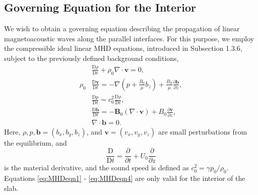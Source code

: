 \documentclass[12pt]{ociamthesis}
\begin{document}
\subsection{Governing Equation for the Interior}
\label{subsec:goveqint}

We wish to obtain a governing equation describing the propagation of linear magnetoacoustic waves along the parallel interfaces.
For this purpose, we employ the compressible ideal linear MHD equations, introduced in Subsection 1.3.6, subject to the previously defined background conditions,
%
\begin{align}
\label{eq:MHDeqn1}
& \frac{\mathrm{D} \rho}{\mathrm{D} t}
+ \rho_0 \nabla \cdot \mathbf{v}
= 0,
\\[0.3cm]
\label{eq:MHDeqn2}
\rho_0 & \frac{\mathrm{D} \mathbf{v}}{\mathrm{D} t}
= - \nabla ( p + \frac{B_0}{\mu} b_z )
+ \frac{B_0}{\mu} \frac{\partial \mathbf{b}}{\partial z},
\\[0.3cm]
\label{eq:MHDeqn3}
& \frac{\mathrm{D} p}{\mathrm{D} t}
= c_0^2 \frac{\mathrm{D} \rho}{\mathrm{D} t},
\\[0.3cm]
\label{eq:MHDeqn4}
& \frac{\mathrm{D} \mathbf{b}}{\mathrm{D} t}
= - \mathbf{B}_0 ( \nabla \cdot \mathbf{v} )
+ B_0 \frac{\partial \mathbf{v}}{\partial z},
\\[0.2cm]
\nonumber
& \nabla \cdot \mathbf{b} = 0.
\end{align}
%
Here, $\rho, p, \mathbf{b} = (b_x, b_y, b_z)$, and $\mathbf{v} = (v_x, v_y, v_z)$ are small perturbations from the equilibrium, and 
\[
\frac{\mathrm{D}}{\mathrm{D} t} = \frac{\partial}{\partial t} + U_0 \frac{\partial}{\partial z}
\]
is the material derivative, and the sound speed is defined as $c_0^2 = \gamma p_0/\rho_0$.
Equations \eqref{eq:MHDeqn1} - \eqref{eq:MHDeqn4} are only valid for the interior of the slab.
\end{document}
